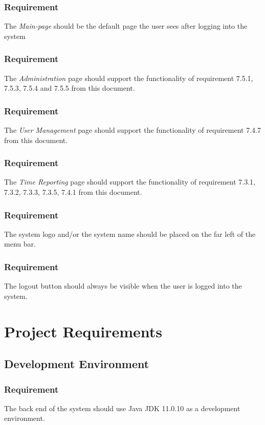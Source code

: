 \documentclass{article}
\begin{document}
\subsubsection{Requirement}
The \textit{Main-page} should be the default page the user sees after logging into the system

\subsubsection{Requirement}
The \textit{Administration} page should support the functionality of requirement 7.5.1, 7.5.3, 7.5.4 and 7.5.5 from this document.

\subsubsection{Requirement}
The \textit{User Management} page should support the functionality of requirement 7.4.7 from this document.

\subsubsection{Requirement}
The \textit{Time Reporting} page should support the functionality of requirement 7.3.1, 7.3.2, 7.3.3, 7.3.5, 7.4.1 from this document.

\subsubsection{Requirement}
The system logo and/or the system name should be placed on the far left
of the menu bar.

\subsubsection{Requirement}
The logout button should always be visible when the user is logged into the system. 

\section{Project Requirements}
\subsection{Development Environment}

\subsubsection{Requirement}
The back end of the system should use Java JDK 11.0.10 as a development environment.
\end{document}

